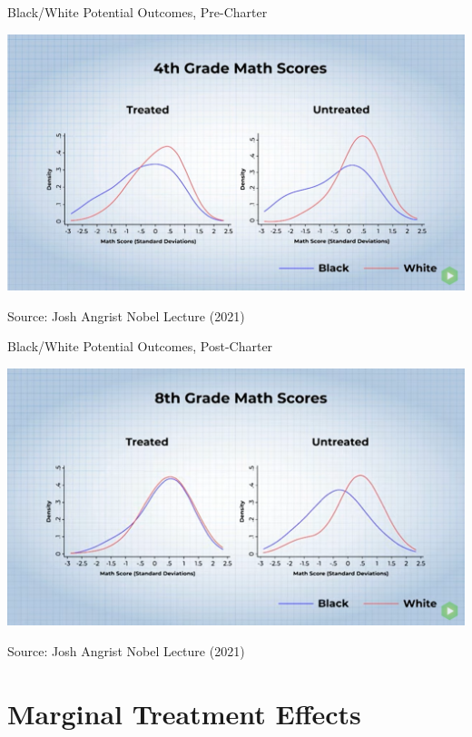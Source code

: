 \documentclass{beamer}
\begin{document}
\begin{frame}{Black/White Potential Outcomes, Pre-Charter}
\vspace{-0.5cm}
\begin{center}
\includegraphics[scale=0.3]{./lecture_includes/angrist_distribution_4.png}
\end{center}
Source: Josh Angrist Nobel Lecture (2021) 
\end{frame}

\begin{frame}{Black/White Potential Outcomes, Post-Charter}
\vspace{-0.5cm}
\begin{center}
\includegraphics[scale=0.3]{./lecture_includes/angrist_distribution_8.png}
\end{center}
Source: Josh Angrist Nobel Lecture (2021) 
\end{frame}

\section{Marginal Treatment Effects}
\end{document}
